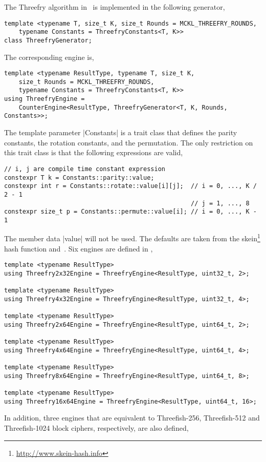 The Threefry algorithm in~\cite{Salmon:2011um} is implemented in the following
generator,
\begin{verbatim}
template <typename T, size_t K, size_t Rounds = MCKL_THREEFRY_ROUNDS,
    typename Constants = ThreefryConstants<T, K>>
class ThreefryGenerator;
\end{verbatim}
The corresponding \rng engine is,
\begin{verbatim}
template <typename ResultType, typename T, size_t K,
    size_t Rounds = MCKL_THREEFRY_ROUNDS,
    typename Constants = ThreefryConstants<T, K>>
using ThreefryEngine =
    CounterEngine<ResultType, ThreefryGenerator<T, K, Rounds, Constants>>;
\end{verbatim}
The template parameter |Constants| is a trait class that defines the parity
constants, the rotation constants, and the permutation. The only restriction on
this trait class is that the following expressions are valid,
\begin{verbatim}
// i, j are compile time constant expression
constexpr T k = Constants::parity::value;
constexpr int r = Constants::rotate::value[i][j];  // i = 0, ..., K / 2 - 1
                                                   // j = 1, ..., 8
constexpr size_t p = Constants::permute::value[i]; // i = 0, ..., K - 1
\end{verbatim}
The member data |value| will not be \odr used. The defaults are taken
from the skein\footnote{\url{http://www.skein-hash.info}} hash function
and~\cite{Salmon:2011um}. Six engines are defined in \mckl,
\begin{verbatim}
template <typename ResultType>
using Threefry2x32Engine = ThreefryEngine<ResultType, uint32_t, 2>;

template <typename ResultType>
using Threefry4x32Engine = ThreefryEngine<ResultType, uint32_t, 4>;

template <typename ResultType>
using Threefry2x64Engine = ThreefryEngine<ResultType, uint64_t, 2>;

template <typename ResultType>
using Threefry4x64Engine = ThreefryEngine<ResultType, uint64_t, 4>;

template <typename ResultType>
using Threefry8x64Engine = ThreefryEngine<ResultType, uint64_t, 8>;

template <typename ResultType>
using Threefry16x64Engine = ThreefryEngine<ResultType, uint64_t, 16>;
\end{verbatim}
In addition, three engines that are equivalent to Threefish-256, Threefish-512
and Threefish-1024 block ciphers, respectively, are also defined,
